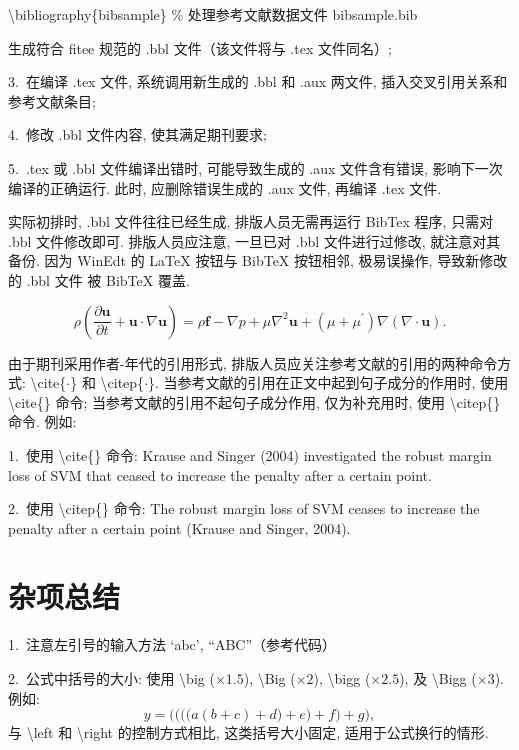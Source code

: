 \documentclass[twoside,twocolumn]{article}
\begin{document}
\begin{CJK}{UTF8}{song}
\textbackslash bibliography\{bibsample\}  \% 处理参考文献数据文件 bibsample.bib

生成符合 fitee 规范的 .bbl 文件（该文件将与 .tex 文件同名）; 

3.~在编译 .tex 文件, 系统调用新生成的 .bbl 和 .aux 两文件, 插入交叉引用关系和参考文献条目; 

4.~修改 .bbl 文件内容, 使其满足期刊要求; 

5.~.tex 或 .bbl 文件编译出错时, 可能导致生成的 .aux 文件含有错误, 影响下一次编译的正确运行. 
此时, 应删除错误生成的 .aux 文件, 再编译 .tex 文件. 

实际初排时, .bbl 文件往往已经生成, 排版人员无需再运行 BibTex 程序, 
只需对 .bbl 文件修改即可. 
排版人员应注意, 一旦已对 .bbl 文件进行过修改, 就注意对其备份. 因为
WinEdt 的 \LaTeX{} 按钮与 BibTeX 按钮相邻, 极易误操作, 导致新修改的 .bbl 文件
被 BibTeX 覆盖. 

\begin{figure}
\begin{equation}
\label{eqn:navi}
\rho\left(\frac{\partial \bm u}{\partial t} + \bm u \cdot \nabla \bm u\right)
= \rho \bm f
- \nabla p + \mu\nabla^2\bm u + (\mu+\mu^\prime)\nabla(\nabla\cdot \bm u).
\end{equation}
\end{figure}


由于期刊采用作者-年代的引用形式, 排版人员应关注参考文献的引用的两种命令方式: 
\textbackslash cite\{$\cdot$\} 和 \textbackslash citep\{$\cdot$\}. 
当参考文献的引用在正文中起到句子成分的作用时, 使用 \textbackslash cite\{\} 命令; 
当参考文献的引用不起句子成分作用, 仅为补充用时, 使用 \textbackslash citep\{\} 命令. 
例如: 

1.~使用 \textbackslash cite\{\} 命令: Krause and Singer (2004) investigated the robust margin
loss of SVM that ceased to increase the penalty after a certain point.

2.~使用 \textbackslash citep\{\} 命令: 
The robust margin loss of SVM ceases to increase
the penalty after a certain point (Krause and Singer, 2004).




\section{杂项总结}

1.~注意左引号的输入方法 `abc', ``ABC''（参考代码）

2.~公式中括号的大小: 使用
\textbackslash big ($\times1.5$), 
\textbackslash Big ($\times2$),
\textbackslash bigg ($\times2.5$), 及
\textbackslash Bigg ($\times3$). 例如: 
\begin{equation*}
y = \Bigg(\bigg(\Big(\big(a(b+c) + d\big) + e\Big) + f\bigg) + g\Bigg) ,
\end{equation*}
与 \textbackslash left 和 \textbackslash right 的控制方式相比, 这类括号大小固定, 适用于公式换行的情形. 


\end{CJK}
\end{document}
